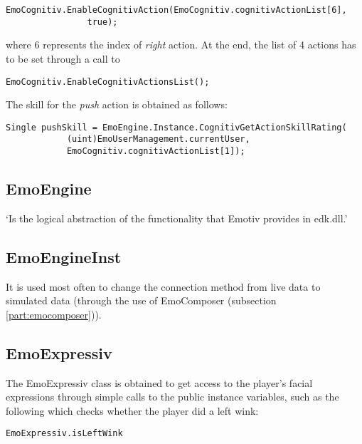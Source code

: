 \begin{Verbatim}[frame=single, framesep=3mm, label={[Beginning of code]End of code}]
EmoCognitiv.EnableCognitivAction(EmoCognitiv.cognitivActionList[6], 
				true);
\end{Verbatim}
		
where 6 represents the index of \textit{right} action. At the end, the list of 4 actions has to be set through a call to 

\begin{Verbatim}[frame=single, framesep=3mm, label={[Beginning of code]End of code}]
EmoCognitiv.EnableCognitivActionsList();
\end{Verbatim}

The skill for the \textit{push} action is obtained as follows:

\begin{Verbatim}[frame=single, framesep=3mm, label={[Beginning of code]End of code}]
Single pushSkill = EmoEngine.Instance.CognitivGetActionSkillRating(
			(uint)EmoUserManagement.currentUser,
			EmoCognitiv.cognitivActionList[1]); 
\end{Verbatim}

\subsection{EmoEngine}
`Is the logical abstraction of the functionality that Emotiv provides in edk.dll.'\cite{emotivSDKUserManual}

\subsection{EmoEngineInst}
It is used most often to change the connection method from live data to simulated data (through the use of EmoComposer (subsection \ref{part:emocomposer})).

\subsection{EmoExpressiv}
The EmoExpressiv class is obtained to get access to the player's facial expressions through simple calls to the public instance variables, such as the following which checks whether the player did a left wink:

\begin{Verbatim}[frame=single, framesep=3mm, label={[Beginning of code]End of code}]
EmoExpressiv.isLeftWink
\end{Verbatim}

